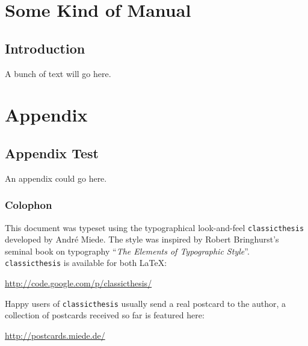 \documentclass[ twoside,openright,titlepage,numbers=noenddot,headinclude,
                footinclude=true,cleardoublepage=empty,abstractoff,%
                BCOR=5mm,paper=letter,fontsize=11pt,letterpaper,%
                american,%
                ]{scrreprt}
\newcounter{dummy}
\begin{document}
    \listoffigures

    \vspace*{8ex}

    \listoftables
    \vspace*{8ex}
\endgroup

\cleardoublepage


\cleardoublepage
\part{Some Kind of Manual}
\chapter{Introduction}
\label{ch:introduction}
A bunch of text will go here.


\appendix
\cleardoublepage
\part{Appendix}
\chapter{Appendix Test}
An appendix could go here.


\manualmark
\markboth{\spacedlowsmallcaps{\bibname}}{\spacedlowsmallcaps{\bibname}} %
{}

\label{app:bibliography}



\pagestyle{empty}
\hfill
\vfill
{}
\section*{Colophon}
This document was typeset using the typographical look-and-feel \texttt{classicthesis} developed by Andr\'e Miede.
The style was inspired by Robert Bringhurst's seminal book on typography ``\emph{The Elements of Typographic Style}''.
\texttt{classicthesis} is available for both \LaTeX:
\begin{center}
\url{http://code.google.com/p/classicthesis/}
\end{center}
Happy users of \texttt{classicthesis} usually send a real postcard to the author, a collection of postcards received so far is featured here:
\begin{center}
\url{http://postcards.miede.de/}
\end{center}
\bigskip
\noindent\finalVersionString
\end{document}
